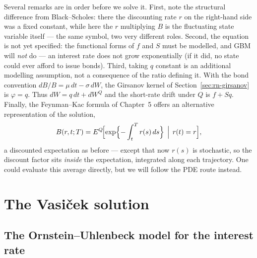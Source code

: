 Several remarks are in order before we solve it.
First, note the structural difference from Black--Scholes: there the discounting rate $r$ on the right-hand side was a fixed constant, while here the $r$ multiplying $B$ is the fluctuating state variable itself --- the same symbol, two very different roles.
Second, the equation is not yet specified: the functional forms of $f$ and $S$ must be modelled, and GBM will \emph{not} do --- an interest rate does not grow exponentially (if it did, no state could ever afford to issue bonds).
Third, taking $q$ constant is an additional modelling assumption, not a consequence of the ratio defining it.
With the bond convention $dB/B=\mu\,dt-\sigma\,dW$, the Girsanov kernel of Section~\ref{sec:rn-girsanov} is $\varphi=q$.
Thus $dW=q\,dt+dW^Q$ and the short-rate drift under $Q$ is $f+Sq$.
Finally, the Feynman--Kac formula of Chapter~5 offers an alternative representation of the solution,
\begin{equation}
B(r,t;T) = E^Q\!\Bigl[\exp\Bigl\{-\int_t^T r(s)\,ds\Bigr\}\,\Bigm|\,r(t)=r\Bigr],
\end{equation}
a discounted expectation as before --- except that now $r(s)$ is stochastic, so the discount factor sits \emph{inside} the expectation, integrated along each trajectory.
One could evaluate this average directly, but we will follow the PDE route instead.


\section{The Vasi\v{c}ek solution}\label{sec:vasicek-solution}

\subsection{The Ornstein--Uhlenbeck model for the interest rate}

